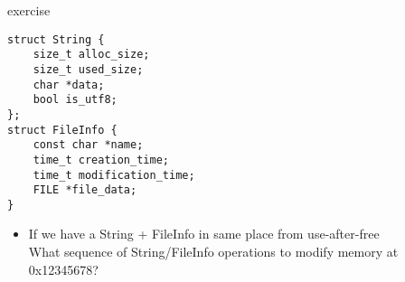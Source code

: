 \begin{frame}[fragile]{exercise}
\begin{Verbatim}[fontsize=\fontsize{9}{10}]
struct String {
    size_t alloc_size;
    size_t used_size;
    char *data;
    bool is_utf8;
};
struct FileInfo {
    const char *name;
    time_t creation_time;
    time_t modification_time;
    FILE *file_data;
}
\end{Verbatim}
\begin{itemize}
\item If we have a String + FileInfo in same place from use-after-free \\
What sequence of String/FileInfo operations to modify memory at 0x12345678?
\end{itemize}
\end{frame}

